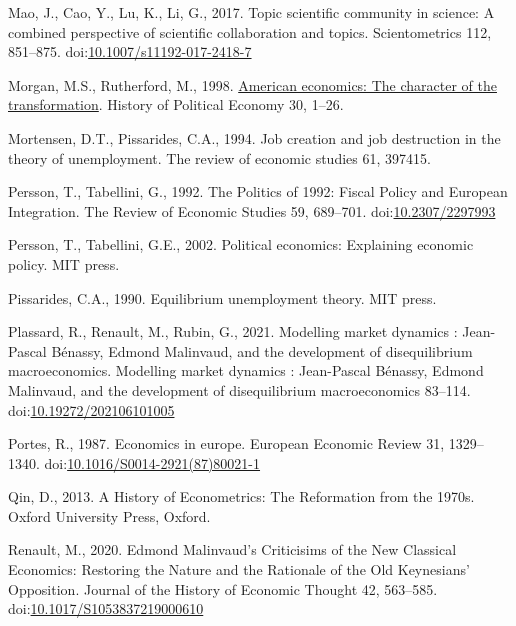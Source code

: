 \documentclass[
]{article}
\newlength{\cslhangindent}
\newlength{\cslentryspacingunit} %
\newenvironment{CSLReferences}[2] %
 {%
  \setlength{\parindent}{0pt}
  \ifodd #1
  \let\oldpar\par
  \def\par{\hangindent=\cslhangindent\oldpar}
  \fi
  \setlength{\parskip}{#2\cslentryspacingunit}
 }%
 {}
\begin{document}
\begin{CSLReferences}{1}{0}
\leavevmode{}%
Mao, J., Cao, Y., Lu, K., Li, G., 2017. Topic scientific community in
science: A combined perspective of scientific collaboration and topics.
Scientometrics 112, 851--875.
doi:\href{https://doi.org/10.1007/s11192-017-2418-7}{10.1007/s11192-017-2418-7}

\leavevmode{}%
Morgan, M.S., Rutherford, M., 1998.
\href{http://search.ebscohost.com/login.aspx?direct=true\&db=bth\&AN=7752144\&lang=fr\&site=ehost-live}{American
economics: The character of the transformation}. History of Political
Economy 30, 1--26.

\leavevmode{}%
Mortensen, D.T., Pissarides, C.A., 1994. Job creation and job
destruction in the theory of unemployment. The review of economic
studies 61, 397415.

\leavevmode{}%
Persson, T., Tabellini, G., 1992. The {Politics} of 1992: {Fiscal
Policy} and {European Integration}. The Review of Economic Studies 59,
689--701. doi:\href{https://doi.org/10.2307/2297993}{10.2307/2297993}

\leavevmode{}%
Persson, T., Tabellini, G.E., 2002. Political economics: Explaining
economic policy. {MIT press}.

\leavevmode{}%
Pissarides, C.A., 1990. Equilibrium unemployment theory. MIT press.

\leavevmode{}%
Plassard, R., Renault, M., Rubin, G., 2021. Modelling market dynamics :
{Jean-Pascal Bénassy}, {Edmond Malinvaud}, and the development of
disequilibrium macroeconomics. Modelling market dynamics : Jean-Pascal
Bénassy, Edmond Malinvaud, and the development of disequilibrium
macroeconomics 83--114.
doi:\href{https://doi.org/10.19272/202106101005}{10.19272/202106101005}

\leavevmode{}%
Portes, R., 1987. Economics in europe. European Economic Review 31,
1329--1340.
doi:\href{https://doi.org/10.1016/S0014-2921(87)80021-1}{10.1016/S0014-2921(87)80021-1}

\leavevmode{}%
Qin, D., 2013. {A History of Econometrics: The Reformation from the
1970s}. {Oxford University Press}, {Oxford}.

\leavevmode{}%
Renault, M., 2020. Edmond {Malinvaud}'s {Criticisims} of the {New
Classical Economics}: {Restoring} the {Nature} and the {Rationale} of
the {Old Keynesians}' {Opposition}. Journal of the History of Economic
Thought 42, 563--585.
doi:\href{https://doi.org/10.1017/S1053837219000610}{10.1017/S1053837219000610}


\end{CSLReferences}
\end{document}
